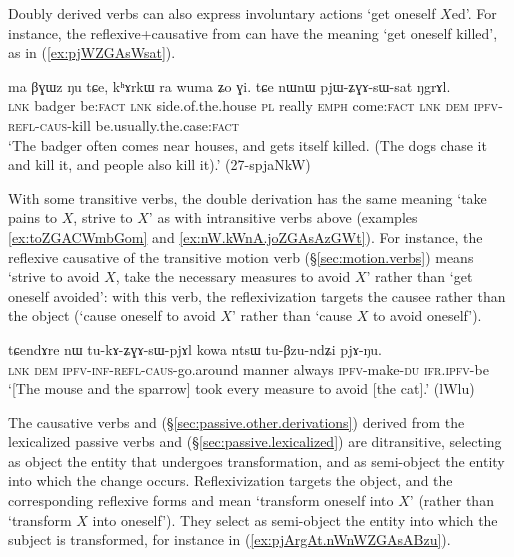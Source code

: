 Doubly derived verbs can also express involuntary actions `get oneself $X$ed'. For instance, the reflexive+causative  from  can have the meaning `get oneself killed', as in (\ref{ex:pjWZGAsWsat}).

\begin{exe}
\ex \label{ex:pjWZGAsWsat}
\gll ma βɣɯz ŋu tɕe, kʰɤrkɯ ra wuma ʑo ɣi. tɕe nɯnɯ pjɯ-ʑɣɤ-sɯ-sat ŋgrɤl. \\ 
\textsc{lnk} badger be:\textsc{fact} \textsc{lnk} side.of.the.house \textsc{pl} really \textsc{emph} come:\textsc{fact} \textsc{lnk} \textsc{dem} \textsc{ipfv}-\textsc{refl}-\textsc{caus}-kill be.usually.the.case:\textsc{fact} \\ 
\glt `The badger often comes near houses, and gets itself killed. (The dogs chase it and kill it, and people also kill it).' (27-spjaNkW)
\end{exe}

With some transitive verbs, the double derivation has the same meaning `take pains to $X$, strive to $X$' as with intransitive verbs above (examples \ref{ex:toZGACWmbGom} and \ref{ex:nW.kWnA.joZGAsAzGWt}). For instance, the reflexive causative  of the transitive motion verb  (§\ref{sec:motion.verbs}) means `strive to avoid $X$, take the necessary measures to avoid $X$' rather than `get oneself avoided': with this verb, the reflexivization targets the causee rather than the object (`cause oneself to avoid $X$' rather than `cause $X$ to avoid oneself').

\begin{exe}
\ex \label{ex:tukAZGAsWpjAl.kowa}
\gll tɕendɤre nɯ tu-kɤ-ʑɣɤ-sɯ-pjɤl kowa ntsɯ tu-βzu-ndʑi pjɤ-ŋu. \\
\textsc{lnk} \textsc{dem} \textsc{ipfv}-\textsc{inf}-\textsc{refl}-\textsc{caus}-go.around manner always \textsc{ipfv}-make-\textsc{du} \textsc{ifr}.\textsc{ipfv}-be \\
\glt `[The mouse and the sparrow] took every measure to avoid [the cat].' (lWlu)
\end{exe}


The causative verbs  and  (§\ref{sec:passive.other.derivations}) derived from the lexicalized passive verbs  and  (§\ref{sec:passive.lexicalized}) are ditransitive, selecting as object the entity that undergoes transformation, and as semi-object the entity into which the change occurs. Reflexivization targets the object, and the corresponding reflexive forms   and  mean `transform oneself into $X$' (rather than `transform $X$ into oneself'). They select as semi-object the entity into which the subject is transformed, for instance  in (\ref{ex:pjArgAt.nWnWZGAsABzu}).

